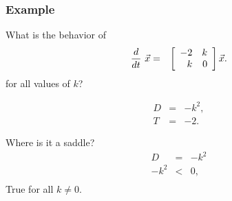 \begin{frame}
  \frametitle{Example}

  What is the behavior of
  \begin{eqnarray*}
    \deriv{~}{t} \vec{x} & = & \arrayTwo{-2}{k}{k}{0} \vec{x}.
  \end{eqnarray*}
  for all values of $k$?

  {
    \begin{eqnarray*}
      D & = & -k^2, \\
      T & = & -2.
    \end{eqnarray*}
  }



  {
    Where is it a saddle?
    \begin{eqnarray*}
      D & = & -k^2 \\
      -k^2 & < & 0, \\ 
    \end{eqnarray*}
    True for all $k\neq 0$.
  }


\end{frame}



